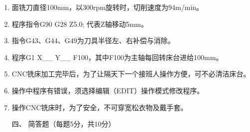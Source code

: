 \documentclass[12pt,twocolumn,landscape,UTF8,twoside]{ctexart}
\begin{document}
\begin{spacing}{1.3}
\begin{enumerate} [1、]
\item 面铣刀直径100mm，以300rpm旋转时，切削速度为94m/min。
\item 程序指令G90 G28 Z5.0; 代表Z轴移动5mm。
\item 指令G43、G44、G49为刀具半径左、右补偿与消除。
\item 程序G1 X\_\_ Y\_\_ F100，其中F100为主轴每回转床台进给100mm。
\item CNC铣床加工完毕后，为了让隔天下一个接班人操作方便，可不必清洁床台。
\item 操作中程序有错误，须选择编辑（EDIT）操作模式修改程序。
\item 操作CNC铣床时，为了安全，不可穿宽松衣物及戴手套。

\vspace{1cm}
	
\item[\heiti 四、] {\heiti 简答题（每题5分，共10分）}

%
%
%
	
	

\end{enumerate}
\end{spacing}
\end{document}
